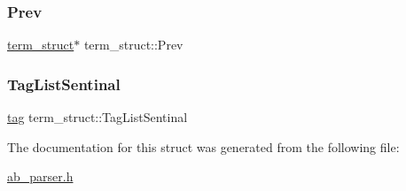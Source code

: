 \mbox{\label{structterm__struct_aa5cc89c03d6af0b5a43680485f5224cb}} 
\subsubsection{\texorpdfstring{Prev}{Prev}}
{\footnotesize\ttfamily \hyperlink{structterm__struct}{term\+\_\+struct}$\ast$ term\+\_\+struct\+::\+Prev}

\mbox{\label{structterm__struct_a95c474434ab1c1d7e1ac66df37592d68}} 
\subsubsection{\texorpdfstring{Tag\+List\+Sentinal}{TagListSentinal}}
{\footnotesize\ttfamily \hyperlink{structtag}{tag} term\+\_\+struct\+::\+Tag\+List\+Sentinal}



The documentation for this struct was generated from the following file\+:\begin{DoxyCompactItemize}
\item 
\hyperlink{ab__parser_8h}{ab\+\_\+parser.\+h}\end{DoxyCompactItemize}
